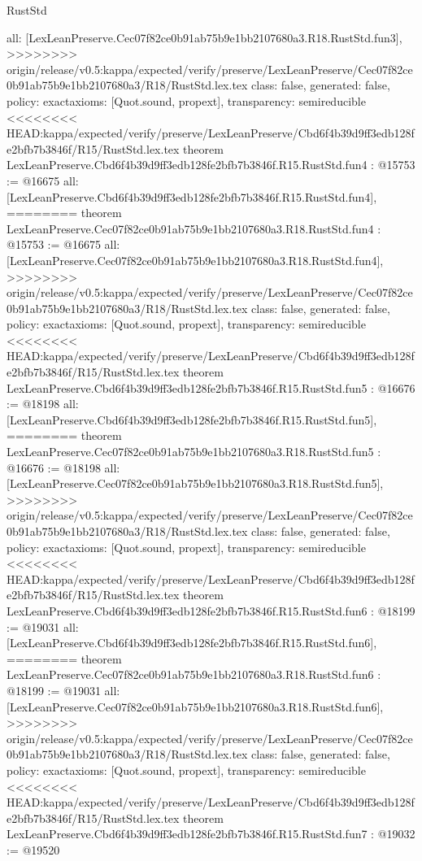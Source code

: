 \begin{lexlean}{RustStd}
\begin{coremodule}
{\begin{coremodule}
{{{{{{{  all: [LexLeanPreserve.Cec07f82ce0b91ab75b9e1bb2107680a3.R18.RustStd.fun3],
>>>>>>>> origin/release/v0.5:kappa/expected/verify/preserve/LexLeanPreserve/Cec07f82ce0b91ab75b9e1bb2107680a3/R18/RustStd.lex.tex
  class: false,
  generated: false,
  policy: exact{axioms: [Quot.sound, propext]},
  transparency: semireducible
}
<<<<<<<< HEAD:kappa/expected/verify/preserve/LexLeanPreserve/Cbd6f4b39d9ff3edb128fe2bfb7b3846f/R15/RustStd.lex.tex
theorem LexLeanPreserve.Cbd6f4b39d9ff3edb128fe2bfb7b3846f.R15.RustStd.fun4 : @15753 := @16675 {
  all: [LexLeanPreserve.Cbd6f4b39d9ff3edb128fe2bfb7b3846f.R15.RustStd.fun4],
========
theorem LexLeanPreserve.Cec07f82ce0b91ab75b9e1bb2107680a3.R18.RustStd.fun4 : @15753 := @16675 {
  all: [LexLeanPreserve.Cec07f82ce0b91ab75b9e1bb2107680a3.R18.RustStd.fun4],
>>>>>>>> origin/release/v0.5:kappa/expected/verify/preserve/LexLeanPreserve/Cec07f82ce0b91ab75b9e1bb2107680a3/R18/RustStd.lex.tex
  class: false,
  generated: false,
  policy: exact{axioms: [Quot.sound, propext]},
  transparency: semireducible
}
<<<<<<<< HEAD:kappa/expected/verify/preserve/LexLeanPreserve/Cbd6f4b39d9ff3edb128fe2bfb7b3846f/R15/RustStd.lex.tex
theorem LexLeanPreserve.Cbd6f4b39d9ff3edb128fe2bfb7b3846f.R15.RustStd.fun5 : @16676 := @18198 {
  all: [LexLeanPreserve.Cbd6f4b39d9ff3edb128fe2bfb7b3846f.R15.RustStd.fun5],
========
theorem LexLeanPreserve.Cec07f82ce0b91ab75b9e1bb2107680a3.R18.RustStd.fun5 : @16676 := @18198 {
  all: [LexLeanPreserve.Cec07f82ce0b91ab75b9e1bb2107680a3.R18.RustStd.fun5],
>>>>>>>> origin/release/v0.5:kappa/expected/verify/preserve/LexLeanPreserve/Cec07f82ce0b91ab75b9e1bb2107680a3/R18/RustStd.lex.tex
  class: false,
  generated: false,
  policy: exact{axioms: [Quot.sound, propext]},
  transparency: semireducible
}
<<<<<<<< HEAD:kappa/expected/verify/preserve/LexLeanPreserve/Cbd6f4b39d9ff3edb128fe2bfb7b3846f/R15/RustStd.lex.tex
theorem LexLeanPreserve.Cbd6f4b39d9ff3edb128fe2bfb7b3846f.R15.RustStd.fun6 : @18199 := @19031 {
  all: [LexLeanPreserve.Cbd6f4b39d9ff3edb128fe2bfb7b3846f.R15.RustStd.fun6],
========
theorem LexLeanPreserve.Cec07f82ce0b91ab75b9e1bb2107680a3.R18.RustStd.fun6 : @18199 := @19031 {
  all: [LexLeanPreserve.Cec07f82ce0b91ab75b9e1bb2107680a3.R18.RustStd.fun6],
>>>>>>>> origin/release/v0.5:kappa/expected/verify/preserve/LexLeanPreserve/Cec07f82ce0b91ab75b9e1bb2107680a3/R18/RustStd.lex.tex
  class: false,
  generated: false,
  policy: exact{axioms: [Quot.sound, propext]},
  transparency: semireducible
}
<<<<<<<< HEAD:kappa/expected/verify/preserve/LexLeanPreserve/Cbd6f4b39d9ff3edb128fe2bfb7b3846f/R15/RustStd.lex.tex
theorem LexLeanPreserve.Cbd6f4b39d9ff3edb128fe2bfb7b3846f.R15.RustStd.fun7 : @19032 := @19520 {
}}}}}}}}}}
\end{coremodule}}
\end{coremodule}
\end{lexlean}
